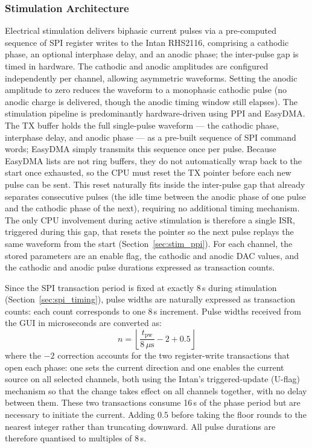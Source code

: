 \subsubsection{Stimulation Architecture}
\label{sec:stim_architecture}

Electrical stimulation delivers biphasic current pulses via a
pre-computed sequence of SPI register writes to the Intan RHS2116, comprising a
cathodic phase, an optional interphase delay, and an anodic phase; the inter-pulse
gap is timed in hardware. The cathodic and anodic amplitudes are configured
independently per channel, allowing asymmetric waveforms. Setting the anodic
amplitude to zero reduces the waveform to a monophasic cathodic pulse (no anodic
charge is delivered, though the anodic timing window still elapses). The stimulation pipeline is predominantly hardware-driven
using PPI and EasyDMA. The TX buffer holds the full single-pulse waveform --- the
cathodic phase, interphase delay, and anodic phase --- as a pre-built sequence of
SPI command words; EasyDMA simply transmits this sequence once per pulse. Because
EasyDMA lists are not ring buffers, they do not automatically wrap back to the
start once exhausted, so the CPU must reset the TX pointer before each new pulse
can be sent. This reset naturally fits inside the inter-pulse gap that already
separates consecutive pulses (the idle time between the anodic phase of one pulse
and the cathodic phase of the next), requiring no additional timing mechanism. The
only CPU involvement during active stimulation is therefore a single ISR, triggered
during this gap, that resets the pointer so the next pulse replays the same
waveform from the start (Section~\ref{sec:stim_ppi}). For
each channel, the stored parameters are an enable flag, the cathodic and anodic
DAC values, and the cathodic and anodic pulse durations expressed as transaction
counts.

Since the SPI transaction period is fixed at exactly 8\,\textmu{}s during
stimulation (Section~\ref{sec:spi_timing}), pulse widths are naturally expressed
as transaction counts: each count corresponds to one 8\,\textmu{}s increment.
Pulse widths received from the GUI in microseconds are converted as:
\begin{equation}
    n = \left\lfloor \frac{t_{\text{pw}}}{8\,\mu\text{s}} - 2 + 0.5 \right\rfloor
\end{equation}
where the $-2$ correction accounts for the two register-write transactions that
open each phase: one sets the current direction and one enables the current source
on all selected channels, both using the Intan's triggered-update (U-flag)
mechanism so that the change takes effect on all channels together, with no delay
between them. These two transactions consume
16\,\textmu{}s of the phase period but are necessary to initiate the current.
Adding $0.5$ before taking the floor rounds to the nearest integer rather than
truncating downward. All pulse durations are therefore
quantised to multiples of 8\,\textmu{}s.

